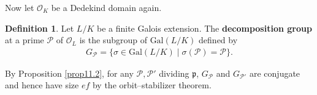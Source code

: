 \documentclass{article}
\theoremstyle{definition}
\newtheorem{defn}{Definition}[section]
\begin{document}
\vspace{1mm}
Now let $\mathcal{O}_K$ be a Dedekind domain again.
\begin{defn}
    Let $L/K$ be a finite Galois extension. The \textbf{decomposition group} at a prime $\mathcal{P}$ of $\mathcal{O}_L$ is the subgroup of $\text{Gal}(L/K)$ defined by 
    \begin{align*}
        G_{\mathcal{P}} = \{\sigma \in \text{Gal}(L/K) \mid \sigma(\mathcal{P}) = \mathcal{P}\}.
    \end{align*}
\end{defn}
By Proposition \ref{prop11.2}, for any $\mathcal{P}, \mathcal{P}'$ dividing $\mathfrak{p}$, $G_{\mathcal{P}}$ and $G_{\mathcal{P}'}$ are conjugate and hence have size $ef$ by the orbit--stabilizer theorem.

\end{document}
